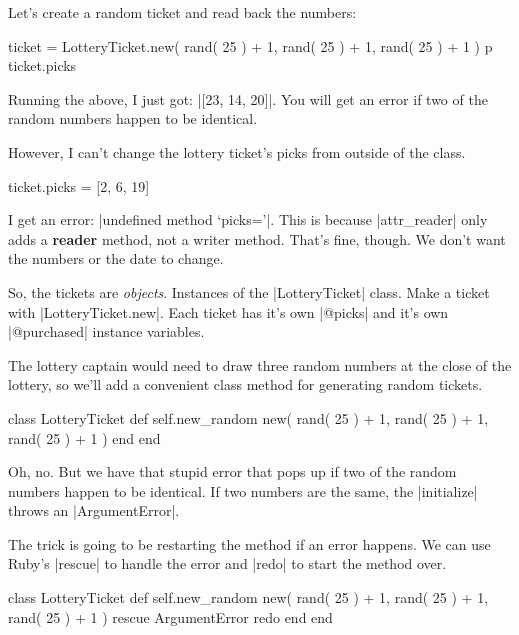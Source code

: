 \documentclass[12pt,twoside]{report}
\begin{document}
Let's create a random ticket and read back the numbers:


\begin{rubycode}

 ticket = LotteryTicket.new( rand( 25 ) + 1,
             rand( 25 ) + 1, rand( 25 ) + 1 )
 p ticket.picks

\end{rubycode}


Running the above, I just got: 
\rubyinline|[23, 14, 20]|.  
You will get an error if two of the random numbers happen to
be identical.

However, I can't change the lottery ticket's picks from outside of the
class.


\begin{rubycode}

 ticket.picks = [2, 6, 19]

\end{rubycode}


I get an error: 
\rubyinline|undefined method `picks='|. 
This is because \rubyinline|attr_reader|
only adds a {\bf reader} method, not a writer method. That's fine,
though.  We don't want the numbers or the date to change.

So, the tickets are {\em objects}.  Instances of the
\rubyinline|LotteryTicket| class.  Make a ticket with
\rubyinline|LotteryTicket.new|.  Each ticket has it's
own \rubyinline|@picks| and it's own
\rubyinline|@purchased| instance variables.

The lottery captain would need to draw three random numbers at the
close of the lottery, so we'll add a convenient class method for
generating random tickets.


\begin{rubycode}

 class LotteryTicket
   def self.new_random
     new( rand( 25 ) + 1, rand( 25 ) + 1, rand( 25 ) + 1 )
   end
 end

\end{rubycode}


Oh, no.  But we have that stupid error that pops up if two of the
random numbers happen to be identical.  If two numbers are the same,
the \rubyinline|initialize| throws an
\rubyinline|ArgumentError|.

The trick is going to be restarting the method if an error happens. We
can use Ruby's \rubyinline|rescue| to handle the error
and \rubyinline|redo| to start the method over.


\begin{rubycode}

 class LotteryTicket
   def self.new_random
     new( rand( 25 ) + 1, rand( 25 ) + 1, rand( 25 ) + 1 )
   rescue ArgumentError
     redo
   end
 end

\end{rubycode}
\end{document}
